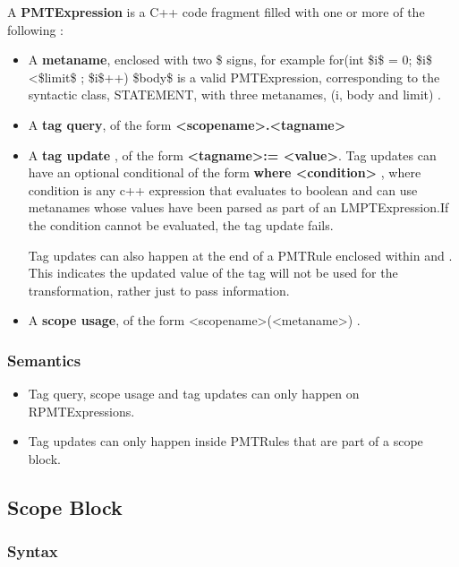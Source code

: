 \documentclass[preprint]{sigplanconf}
\begin{document}
A \textbf{PMTExpression} is a C++ code fragment filled with one or more of the following :
\begin{itemize}
\item A \textbf{metaname}, enclosed with two \$ signs, for example 
    	for(int \$i\$ = 0; \$i\$ \textless  \$limit\$ ; \$i\$++) { \$body\$} is a valid PMTExpression,              corresponding to the syntactic class, STATEMENT, with three metanames, (i, body and limit) . 
\item A \textbf{tag query}, of the form \textbf{\textless scopename\textgreater.\textless tagname\textgreater}
\item A \textbf{tag update} , of the form \textbf{{{ \textless tagname\textgreater := \textless value\textgreater }}}.  Tag updates can have an optional conditional of the form \textbf{{{where \textless condition\textgreater}}} , where condition is any c++ expression that evaluates to boolean and can use metanames whose values have been parsed as part of an LMPTExpression.If the condition cannot be evaluated, the tag update fails.

Tag updates can also happen at the end of a PMTRule enclosed within {{ and }}. This indicates the updated value of the tag will not be used for the transformation, rather just to pass information. 
\item A \textbf{scope usage}, of the form \textless scopename\textgreater(\textless metaname\textgreater) .

\end{itemize}

\subsubsection{Semantics}

\begin{itemize}
\item Tag query, scope usage and tag updates can only happen on RPMTExpressions.
\item Tag updates can only happen inside PMTRules that are part of a scope block.

\end{itemize}
\subsection{Scope Block}
\subsubsection{Syntax}
\end{document}
